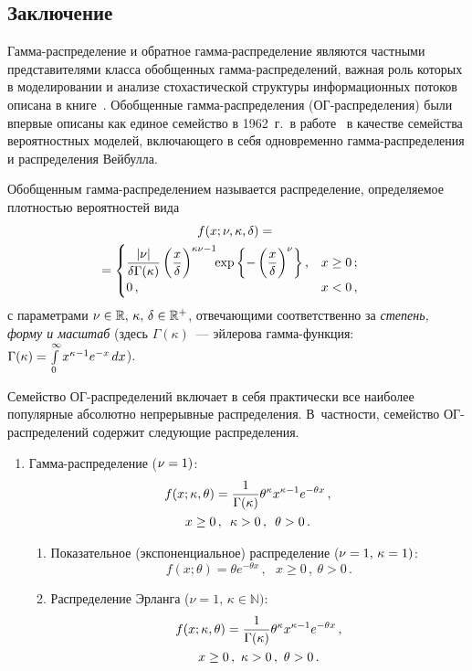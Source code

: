 \begin{multicols}{2}
\section{Заключение}

Гамма-распределение и обратное гамма-рас\-пре\-де\-ле\-ние являются
частными представителями класса обобщенных гам\-ма-рас\-пре\-де\-ле\-ний,
важная роль которых в моделировании и анализе стохастической
структуры информационных потоков описана в книге~\cite{KorolevShorgin2011}. 
Обобщенные гам\-ма-рас\-пре\-де\-ле\-ния
(ОГ-рас\-пре\-де\-ле\-ния) были впервые описаны как единое семейство в
1962~г.\ в работе~\cite{Stacy1962} в качестве семейства
вероятностных моделей, вклю\-ча\-юще\-го в себя одновременно
гам\-ма-рас\-пре\-де\-ле\-ния и распределения Вейбулла.

Обобщенным гамма-рас\-пре\-де\-ле\-ни\-ем называется распределение,
определяемое плот\-ностью вероятностей вида
\begin{multline}
f(x;\nu,\kappa,\delta)={}\\
\hspace*{-4.5mm}{}=
\begin{cases}{
\fr{|\nu|}{\delta\Gamma(\kappa)}\left(\fr{x}{\delta}\right)^{\kappa\nu-1}\!\!\exp
\left\{-\left(\fr{x}{\delta}\right)^{\nu}\right\}}\,,
& x\ge0\,;\\
0\,, & x<0\,,
\end{cases}\label{e16-kor}
\end{multline}
с параметрами $\nu\hm\in\mathbb{R},\,\kappa,\,\delta\hm\in{\mathbb R}^+$, 
отвечающими соответственно за \textit{степень, форму и
масштаб} (здесь $\Gamma(\kappa)$~--- эйлерова гамма-функ\-ция:
$
\Gamma(\kappa)\hm=\int\limits_{0}^{\infty}x^{\kappa-1}e^{-x}\,dx
$).

Семейство ОГ-рас\-пре\-де\-ле\-ний включает в
себя практически все наиболее популярные абсолютно непрерывные
распределения. В~част\-ности, семейство ОГ-рас\-пре\-де\-ле\-ний содержит
следующие распределения.
\begin{enumerate}[1.]
\item Гамма-распределение ($\nu\hm=1)$:
\begin{multline*}
f(x;\kappa,\theta)=\displaystyle\frac{\displaystyle 1\mathstrut}{\displaystyle \Gamma(\kappa)\mathstrut}\theta^{\kappa}x^{\kappa-1}e^{-\theta x}\,,\\
x\ge0\,,\enskip \kappa>0\,,\enskip \theta>0\,.
\end{multline*}
\begin{enumerate}[{1}.1]
\item Показательное (экспоненциальное) распределение ($\nu\hm=1,\, \kappa\hm=1)$:
$$
f(x;\theta)=\theta e^{-\theta x}\,,\ \ \ x\ge0\,,\ \theta>0\,.
$$
\item Распределение Эрланга ($\nu=1,\, \kappa\in\mathbb{N})$:
\begin{multline*}
f(x;\kappa,\theta)=\displaystyle\frac{\displaystyle 1\mathstrut}{\displaystyle \Gamma(\kappa)\mathstrut}\theta^{\kappa}x^{\kappa-1}e^{-\theta
x}\,,\\ 
x\ge0\,,\ \kappa>0\,,\ \theta>0\,.
\end{multline*}


\end{enumerate}
\end{enumerate}
\end{multicols}
